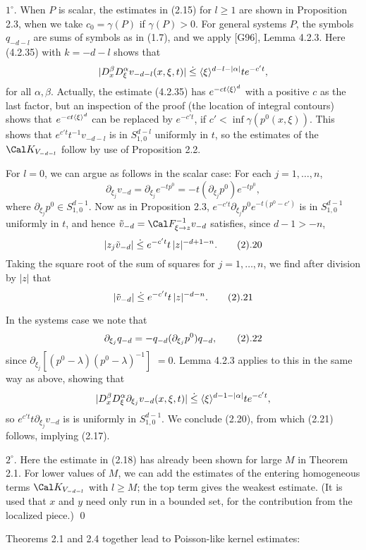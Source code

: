  $1^\circ$.
When $P$ is scalar, the estimates in (2.15) for $l\ge 1$ are shown in
Proposition 2.3, when we take $c_0=\gamma (P)$ if $\gamma (P)>0$.
For general systems $P$, the symbols $q_{-d-l}$ are sums of symbols as
in (1.7), and we apply [G96], Lemma 4.2.3. Here (4.2.35) with
$k=-d-l$ shows that
$$
|D_x^\beta D_\xi ^\alpha v_{-d-l}(x,\xi ,t)|\;\dot{\le}\; \langle {\xi} \rangle ^{d-l-|\alpha |}te^{-c't},
$$
for all $\alpha ,\beta $. Actually, the estimate (4.2.35) has $e^{-ct\langle {\xi} \rangle
^d}$ with a positive $c$ as the last factor, but an inspection of the
proof (the location of integral contours) shows that $e^{-ct\langle {\xi} \rangle
^d}$ can be replaced by $e^{-c't}$,
if $c'<\inf\gamma
(p^0(x,\xi ))$.
This shows that $e^{c't}t^{-1}v_{-d-l}$ is in $S^{d-l}_{1,0}$ uniformly in
$t$, so the estimates of the $\Cal K_{V_{-d-l}}$ follow by use of
Proposition 2.2.

 For $l=0$, we can
argue as follows in the scalar case: For each $j=1,\dots,n$,
$$
\partial_{\xi _j}v_{-d}=\partial_{\xi _j}e^{-tp^0}=-t(\partial_{\xi _j}p^0)e^{-tp^0},$$
where $\partial_{\xi _j}p^0\in S^{d-1}_{1,0}$. Now as in Proposition 2.3,
$e^{-c't}\partial_{\xi _j}p^0e^{-t(p^0-c')}$ is in $S^{d-1}_{1,0}$ uniformly in
$t$, and hence $\tilde v_{-d}=\Cal F^{-1}_{\xi \to z}v_{-d}$
satisfies, since $d-1>-n$,
$$
|z_j\tilde v_{-d}|\leg  e^{-c't}t\,|z|^{-d+1-n}.\tag2.20
$$
Taking the square root of the sum of squares for $j=1,\dots,n$, we find
after division by $|z|$ that
$$
|\tilde v_{-d}|\leg e^{-c't}t\,|z|^{-d-n}.\tag2.21
$$

In the systems case we note that $$
\partial_{\xi
_j}q_{-d}=-q_{-d}(\partial_{\xi _j}p^0)q_{-d},\tag2.22
$$ since
$\partial_{\xi
_j}[(p^0-\lambda )(p^0-\lambda )^{-1}]$
$=0$. Lemma 4.2.3 applies to
this in the same way as above, showing that
$$
|D_x^\beta D_\xi ^\alpha \partial_{\xi _j}v_{-d}(x,\xi ,t)|\;\dot{\le}\; \langle {\xi} \rangle ^{d-1-|\alpha |}te^{-c't},
$$
so $e^{c't}t\partial_{\xi _j}v_{-d}$ is
is uniformly in $S^{d-1}_{1,0}$. We conclude (2.20), from which (2.21)
follows, implying (2.17).


$2^\circ$. Here the estimate in (2.18) has already been shown for large $M$ in
Theorem 2.1.
For lower values of $M$, we can add the
estimates of the entering homogeneous terms $\Cal K_{V_{-d-l}}$ with
$l\ge M$;
the top term gives the weakest estimate. (It is used that $x$ and $y$ need only run in a
bounded set, for the contribution from the localized piece.)
\qed


\enddemo


Theorems 2.1 and 2.4 together lead to Poisson-like kernel estimates:

